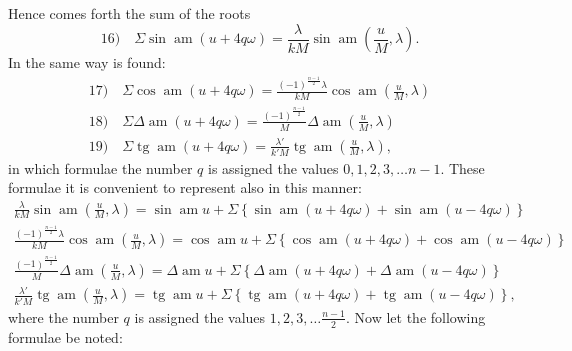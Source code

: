 \documentclass{article}
\begin{document}
Hence comes forth the sum of the roots
\[
\text{16)}\quad\Sigma\sin\operatorname{am}(u+4q\omega)=\frac{\lambda}{kM}\sin\operatorname{am}\left(\frac{u}{M},\lambda\right).
\]
In the same way is found:
\[
\begin{gathered}
\text{17)}\quad\Sigma\cos\operatorname{am}(u+4q\omega)=\frac{(-1)^{\frac{n-1}{2}}\lambda}{kM}\cos\operatorname{am}\left(\frac{u}{M},\lambda\right)\\[1.5ex]
\text{18)}\quad\Sigma\Delta\operatorname{am}(u+4q\omega)=\frac{(-1)^{\frac{n-1}{2}}}{M}\Delta\operatorname{am}\left(\frac{u}{M},\lambda\right)\\[1.5ex]
\text{19)}\quad\Sigma\operatorname{tg}\operatorname{am}(u+4q\omega)=\frac{\lambda'}{k'M}\operatorname{tg}\operatorname{am}\left(\frac{u}{M},\lambda\right),
\end{gathered}
\]
in which formulae the number $q$ is assigned the values $0,1,2,3,\ldots n-1$. These formulae it is convenient to represent also in this manner:
\[
\begin{gathered}
\frac{\lambda}{kM}\sin\operatorname{am}\left(\frac{u}{M},\lambda\right)=\sin\operatorname{am}u+\Sigma\left\{\sin\operatorname{am}(u+4q\omega)+\sin\operatorname{am}(u-4q\omega)\right\}\\[1.5ex]
\frac{(-1)^{\frac{n-1}{2}}\lambda}{kM}\cos\operatorname{am}\left(\frac{u}{M},\lambda\right)=\cos\operatorname{am}u+\Sigma\left\{\cos\operatorname{am}(u+4q\omega)+\cos\operatorname{am}(u-4q\omega)\right\}\\[1.5ex]
\frac{(-1)^{\frac{n-1}{2}}}{M}\Delta\operatorname{am}\left(\frac{u}{M},\lambda\right)=\Delta\operatorname{am}u+\Sigma\left\{\Delta\operatorname{am}(u+4q\omega)+\Delta\operatorname{am}(u-4q\omega)\right\}\\[1.5ex]
\frac{\lambda'}{k'M}\operatorname{tg}\operatorname{am}\left(\frac{u}{M},\lambda\right)=\operatorname{tg}\operatorname{am}u+\Sigma\left\{\operatorname{tg}\operatorname{am}(u+4q\omega)+\operatorname{tg}\operatorname{am}(u-4q\omega)\right\},
\end{gathered}
\]
where the number $q$ is assigned the values $1,2,3,\ldots\frac{n-1}{2}$. Now let the following formulae be noted:
\end{document}
